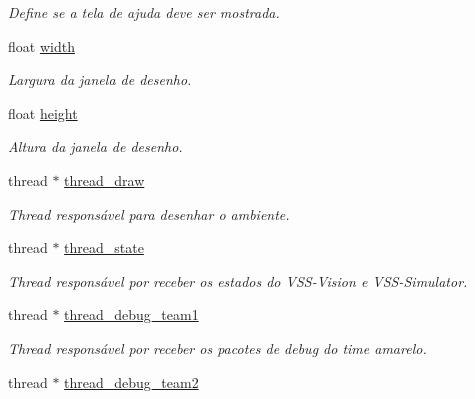 \begin{DoxyCompactItemize}
\begin{DoxyCompactList}\small\item\em Define se a tela de ajuda deve ser mostrada. \end{DoxyCompactList}\item 
float \hyperlink{classGraphics_a5b0018455ff1e2ab3d43d1446cfdfe4d}{width}\hypertarget{classGraphics_a5b0018455ff1e2ab3d43d1446cfdfe4d}{}\label{classGraphics_a5b0018455ff1e2ab3d43d1446cfdfe4d}

\begin{DoxyCompactList}\small\item\em Largura da janela de desenho. \end{DoxyCompactList}\item 
float \hyperlink{classGraphics_a47cbc0011a0a10476fec75d62d7e0fcf}{height}\hypertarget{classGraphics_a47cbc0011a0a10476fec75d62d7e0fcf}{}\label{classGraphics_a47cbc0011a0a10476fec75d62d7e0fcf}

\begin{DoxyCompactList}\small\item\em Altura da janela de desenho. \end{DoxyCompactList}\item 
thread $\ast$ \hyperlink{classGraphics_ac8094b0bd8b0962735f5fdebb7b70f53}{thread\+\_\+draw}\hypertarget{classGraphics_ac8094b0bd8b0962735f5fdebb7b70f53}{}\label{classGraphics_ac8094b0bd8b0962735f5fdebb7b70f53}

\begin{DoxyCompactList}\small\item\em Thread responsável para desenhar o ambiente. \end{DoxyCompactList}\item 
thread $\ast$ \hyperlink{classGraphics_a202be3ede52a05610cdd075e018e69ae}{thread\+\_\+state}\hypertarget{classGraphics_a202be3ede52a05610cdd075e018e69ae}{}\label{classGraphics_a202be3ede52a05610cdd075e018e69ae}

\begin{DoxyCompactList}\small\item\em Thread responsável por receber os estados do V\+S\+S-\/\+Vision e V\+S\+S-\/\+Simulator. \end{DoxyCompactList}\item 
thread $\ast$ \hyperlink{classGraphics_a291d3fb993aaf96ffe574ce850ef147f}{thread\+\_\+debug\+\_\+team1}\hypertarget{classGraphics_a291d3fb993aaf96ffe574ce850ef147f}{}\label{classGraphics_a291d3fb993aaf96ffe574ce850ef147f}

\begin{DoxyCompactList}\small\item\em Thread responsável por receber os pacotes de debug do time amarelo. \end{DoxyCompactList}\item 
thread $\ast$ \hyperlink{classGraphics_af5011e9e4e9a8eddbf1d1a75156c8f7e}{thread\+\_\+debug\+\_\+team2}\hypertarget{classGraphics_af5011e9e4e9a8eddbf1d1a75156c8f7e}{}\label{classGraphics_af5011e9e4e9a8eddbf1d1a75156c8f7e}


\end{DoxyCompactItemize}
